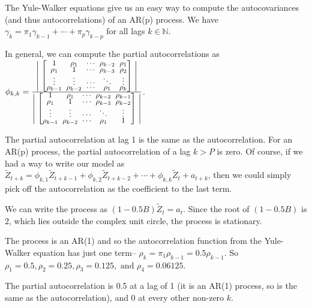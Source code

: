 \documentclass[12pt, letterpaper]{article}
\newcommand{\mymatrix}[1]{
	\renewcommand{\arraystretch}{0.5} %
	\setlength\arraycolsep{3pt}       %
	\scalebox{0.90}{                  %
		$\begin{bmatrix}
			#1
		\end{bmatrix}$
	}                   
	\renewcommand{\arraystretch}{1.0} %
	\setlength\arraycolsep{6pt}       %
}
\theoremstyle{definition}
\numberwithin{equation}{section}
\newcommand{\+}[1]{+_{\scalebox{.375}{#1}}}
\newcommand{\N}{\mathbb{N}}
\newcommand{\1}{\mathbbm{1}}
\begin{document}
The Yule-Walker equations give us an easy way to compute the autocovariances (and thus autocorrelations) of an AR(p) process. We have $\gamma_k=\pi_1\gamma_{k-1}+\cdots+\pi_p\gamma_{k-p}$ for all lags $k\in \N$.
\vspace{\baselineskip}

In general, we can compute the partial autocorrelations as $\phi_{k,k}=\frac{\left|\mymatrix{
		1 & \rho_1 & \cdots & \rho_{k-2} & \rho_1 \\
		\rho_1 & 1 & \cdots & \rho_{k-3} & \rho_2\\
		\vdots & \vdots & \cdots & \ddots & \vdots\\
		\rho_{k-1} & \rho_{k-2} & \cdots & \rho_1 & \rho_k
	}\right|}{\left|\mymatrix{
		1 & \rho_1 & \cdots & \rho_{k-2} & \rho_{k-1} \\
		\rho_1 & 1 & \cdots & \rho_{k-3} & \rho_{k-2}\\
		\vdots & \vdots & \cdots & \ddots & \vdots\\
		\rho_{k-1} & \rho_{k-2} & \cdots & \rho_1 & 1
	}\right|}$. 

The partial autocorrelation at lag 1 is the same as the autocorrelation. For an AR(p) process, the partial autocorrelation of a lag $k>P$ is zero. Of course, if we had a way to write our model as $\tilde{Z}_{t+k}=\phi_{k,1}\tilde{Z}_{t+k-1}+\phi_{k,2}\tilde{Z}_{t+k-2}+\cdots+\phi_{k,k}\tilde{Z}_{t}+a_{t+k}$, then we could simply pick off the autocorrelation as the coefficient to the last term.

\vspace{\baselineskip}
\noindent\textbf{}
\vspace{\baselineskip}

We can write the process as $(1-0.5B)\tilde{Z}_t=a_t$. Since the root of $(1-0.5B)$ is $2$, which lies outside the complex unit circle, the process is stationary.
\vspace{\baselineskip}

The process is an AR(1) and so the autocorrelation function from the Yule-Walker equation has just one term-- $\rho_k=\pi_1\rho_{k-1}=0.5\rho_{k-1}$. So $\rho_1=0.5, \rho_2=0.25, \rho_3=0.125, \text{ and } \rho_4=0.06125$.
\vspace{\baselineskip}

The partial autocorrelation is 0.5 at a lag of 1 (it is an AR(1) process, so is the same as the autocorrelation), and 0 at every other non-zero $k$.


\vspace{\baselineskip}
\noindent\textbf{}
\vspace{\baselineskip}
\end{document}
